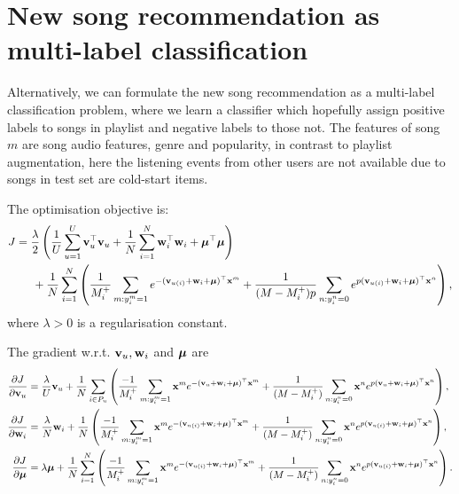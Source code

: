 \section{New song recommendation as multi-label classification}

Alternatively, we can formulate the new song recommendation as a multi-label classification problem,
where we learn a classifier which hopefully assign positive labels to songs in playlist and negative labels to those not.
The features of song $m$ are song audio features, genre and popularity, in contrast to playlist augmentation,
here the listening events from other users are not available due to songs in test set are cold-start items.

The optimisation objective is:
\begin{equation*}
\begin{aligned}
J &= \frac{\lambda}{2} \left( \frac{1}{U} \sum_{u=1}^U \mathbf{v}_u^\top \mathbf{v}_u 
     + \frac{1}{N} \sum_{i=1}^N \mathbf{w}_i^\top \mathbf{w}_i + \bm{\mu}^\top \bm{\mu} \right) \\
& \hspace{1.5em}
     + \frac{1}{N} \sum_{i=1}^N \left( \frac{1}{M_i^+} \sum_{m: y_i^m = 1} e^{-(\mathbf{v}_{u(i)} + \mathbf{w}_i + \bm{\mu})^\top \mathbf{x}^m} 
     + \frac{1}{(M - M_i^+) p} \sum_{n: y_i^n = 0} e^{p (\mathbf{v}_{u(i)} + \mathbf{w}_i + \bm{\mu})^\top \mathbf{x}^n} \right),
\end{aligned}
\end{equation*}
where $\lambda > 0$ is a regularisation constant.


The gradient w.r.t. $\mathbf{v}_u, \mathbf{w}_i$ and $\bm{\mu}$ are
\begin{equation*}
\begin{aligned}
\frac{\partial J}{\partial \mathbf{v}_u}
&= \frac{\lambda}{U} \mathbf{v}_u + \frac{1}{N} \sum_{i \in P_u} \left( 
   \frac{-1}{M_i^+} \sum_{m: y_i^m = 1} \mathbf{x}^m e^{-(\mathbf{v}_{u} + \mathbf{w}_i + \bm{\mu})^\top \mathbf{x}^m} 
   + \frac{1}{(M - M_i^+)} \sum_{n: y_i^n = 0} \mathbf{x}^n e^{p (\mathbf{v}_{u} + \mathbf{w}_i + \bm{\mu})^\top \mathbf{x}^n} \right), \\
\frac{\partial J}{\partial \mathbf{w}_i}
&= \frac{\lambda}{N} \mathbf{w}_i + \frac{1}{N} \left( 
   \frac{-1}{M_i^+} \sum_{m: y_i^m = 1} \mathbf{x}^m e^{-(\mathbf{v}_{u(i)} + \mathbf{w}_i + \bm{\mu})^\top \mathbf{x}^m} 
   + \frac{1}{(M - M_i^+)} \sum_{n: y_i^n = 0} \mathbf{x}^n e^{p (\mathbf{v}_{u(i)} + \mathbf{w}_i + \bm{\mu})^\top \mathbf{x}^n} \right), \\
\frac{\partial J}{\partial \bm{\mu}}
&= \lambda \bm{\mu} + \frac{1}{N} \sum_{i=1}^N \left( 
   \frac{-1}{M_i^+} \sum_{m: y_i^m = 1} \mathbf{x}^m e^{-(\mathbf{v}_{u(i)} + \mathbf{w}_i + \bm{\mu})^\top \mathbf{x}^m} 
   + \frac{1}{(M - M_i^+)} \sum_{n: y_i^n = 0} \mathbf{x}^n e^{p (\mathbf{v}_{u(i)} + \mathbf{w}_i + \bm{\mu})^\top \mathbf{x}^n} \right).
\end{aligned}
\end{equation*}
